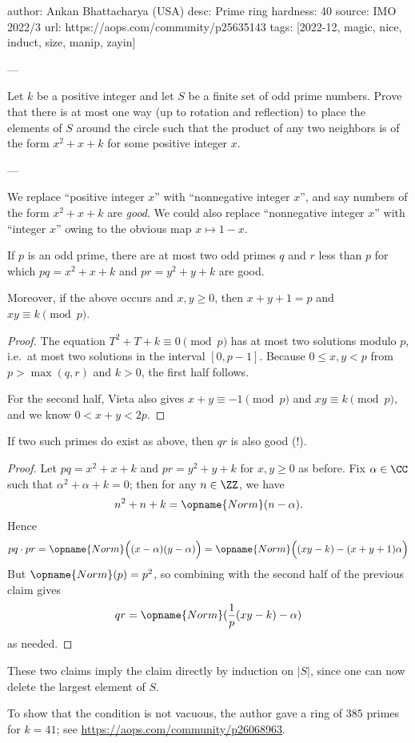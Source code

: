 author: Ankan Bhattacharya (USA)
desc: Prime ring
hardness: 40
source: IMO 2022/3
url: https://aops.com/community/p25635143
tags: [2022-12, magic, nice, induct, size, manip, zayin]

---

Let $k$ be a positive integer and let $S$ be a finite set of odd prime numbers.
Prove that there is at most one way (up to rotation and reflection)
to place the elements of $S$ around the circle such that the product
of any two neighbors is of the form $x^2+x+k$ for some positive integer $x$.

---

We replace ``positive integer $x$'' with ``nonnegative integer $x$'',
and say numbers of the form $x^2+x+k$ are \emph{good}.
We could also replace ``nonnegative integer $x$'' with ``integer $x$''
owing to the obvious map $x \mapsto 1-x$.

\begin{claim*}
  If $p$ is an odd prime, there are at most two odd primes $q$ and $r$
  less than $p$ for which $pq = x^2+x+k$ and $pr = y^2+y+k$ are good.

  Moreover, if the above occurs and $x,y \ge 0$,
  then $x+y+1=p$ and $xy \equiv k \pmod p$.
\end{claim*}
\begin{proof}
  The equation $T^2+T+k \equiv 0 \pmod{p}$ has at most two solutions
  modulo $p$, i.e.\ at most two solutions in the interval $[0,p-1]$.
  Because $0 \le x,y < p$ from $p > \max(q,r)$ and $k > 0$,
  the first half follows.

  For the second half,
  Vieta also gives $x+y \equiv -1 \pmod p$ and $xy \equiv k \pmod p$,
  and we know $0 < x+y < 2p$.
\end{proof}

\begin{claim*}
  If two such primes do exist as above, then $qr$ is also good (!).
\end{claim*}
\begin{proof}
  Let $pq = x^2+x+k$ and $pr = y^2+y+k$ for $x,y \ge 0$ as before.
  Fix $\alpha \in \CC$ such that $\alpha^2 + \alpha + k = 0$;
  then for any $n \in \ZZ$, we have
  \[ n^2 + n + k = \opname{Norm}(n-\alpha). \]
  Hence
  \[
    pq \cdot pr = \opname{Norm}\Big((x-\alpha)(y-\alpha)\Big)
    = \opname{Norm}\Big( (xy-k) - (x+y+1)\alpha\Big)
  \]
  But $\opname{Norm}(p) = p^2$,
  so combining with the second half of the previous claim gives
  \[ qr = \opname{Norm}(\frac1p(xy-k)-\alpha) \] as needed.
\end{proof}

These two claims imply the claim directly by induction on $|S|$,
since one can now delete the largest element of $S$.

\begin{remark*}
  To show that the condition is not vacuous,
  the author gave a ring of $385$ primes for $k=41$;
  see \url{https://aops.com/community/p26068963}.
\end{remark*}
